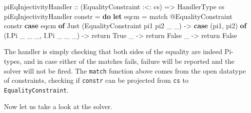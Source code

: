 \documentclass[
  sigconf,
  screen,
  review]{acmart}
\newenvironment{Shaded}{}{}
\newcommand{\DataTypeTok}[1]{\textcolor[rgb]{0.56,0.13,0.00}{#1}}
\newcommand{\FunctionTok}[1]{\textcolor[rgb]{0.02,0.16,0.49}{#1}}
\newcommand{\KeywordTok}[1]{\textcolor[rgb]{0.00,0.44,0.13}{\textbf{#1}}}
\newcommand{\NormalTok}[1]{#1}
\newcommand{\OperatorTok}[1]{\textcolor[rgb]{0.40,0.40,0.40}{#1}}
\newcommand{\OtherTok}[1]{\textcolor[rgb]{0.00,0.44,0.13}{#1}}
\begin{document}
\begin{Shaded}
\begin{Highlighting}[]
\OtherTok{piEqInjectivityHandler ::}\NormalTok{ (}\DataTypeTok{EqualityConstraint} \OperatorTok{:\textless{}:}\NormalTok{ cs)}
                       \OtherTok{=\textgreater{}} \DataTypeTok{HandlerType}\NormalTok{ cs}
\NormalTok{piEqInjectivityHandler constr }\OtherTok{=} \KeywordTok{do}
  \KeywordTok{let}\NormalTok{ eqcm }\OtherTok{=}\NormalTok{ match }\OperatorTok{@}\DataTypeTok{EqualityConstraint}\NormalTok{ constr}
  \KeywordTok{case}\NormalTok{ eqcm }\KeywordTok{of}
    \DataTypeTok{Just}\NormalTok{ (}\DataTypeTok{EqualityConstraint}\NormalTok{ pi1 pi2 \_ \_) }\OtherTok{{-}\textgreater{}}
      \KeywordTok{case}\NormalTok{ (pi1, pi2) }\KeywordTok{of}
\NormalTok{        (}\DataTypeTok{I.Pi}\NormalTok{ \_ \_ \_, }\DataTypeTok{I.Pi}\NormalTok{ \_ \_ \_) }\OtherTok{{-}\textgreater{}} \FunctionTok{return} \DataTypeTok{True}
\NormalTok{        \_ }\OtherTok{{-}\textgreater{}} \FunctionTok{return} \DataTypeTok{False}
\NormalTok{    \_ }\OtherTok{{-}\textgreater{}} \FunctionTok{return} \DataTypeTok{False}
\end{Highlighting}
\end{Shaded}

The handler is simply checking that both sides of the equality are
indeed Pi-types, and in case either of the matches fails, failure will
be reported and the solver will not be fired. The \texttt{match}
function above comes from the open datatype of constraints, checking if
\texttt{constr} can be projected from \texttt{cs} to
\texttt{EqualityConstraint}.

Now let us take a look at the solver.
\end{document}
